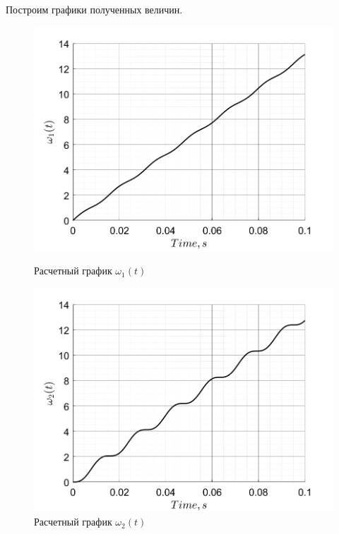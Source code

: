 Построим графики полученных величин.
\begin{figure}[!h]
    \centering
    \begin{minipage}{0.5\textwidth}
        \centering
        \includegraphics[width = \textwidth]{img/count_omega1}
        \caption{Расчетный график $\omega_1(t)$}
    \end{minipage}%
    \begin{minipage}{0.5\textwidth}
        \centering
        \includegraphics[width = \textwidth]{img/count_omega2}
        \caption{Расчетный график $\omega_2(t)$}
    \end{minipage}\label{fig:figure2}%
\end{figure}

